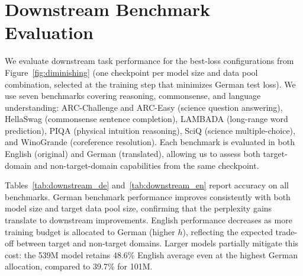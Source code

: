 \section{Downstream Benchmark Evaluation}
\label{app:downstream}

We evaluate downstream task performance for the best-loss configurations from Figure~\ref{fig:diminishing} (one checkpoint per model size and data pool combination, selected at the training step that minimizes German test loss). We use seven benchmarks covering reasoning, commonsense, and language understanding:
ARC-Challenge and ARC-Easy \citep{clark2018think} (science question answering),
HellaSwag \citep{zellers2019hellaswag} (commonsense sentence completion),
LAMBADA \citep{paperno2016lambada} (long-range word prediction),
PIQA \citep{bisk2020piqa} (physical intuition reasoning),
SciQ \citep{welbl2017sciq} (science multiple-choice),
and WinoGrande \citep{sakaguchi2020winogrande} (coreference resolution).
Each benchmark is evaluated in both English (original) and German (translated), allowing us to assess both target-domain and non-target-domain capabilities from the same checkpoint.

Tables~\ref{tab:downstream_de} and~\ref{tab:downstream_en} report accuracy on all benchmarks.
German benchmark performance improves consistently with both model size and target data pool size, confirming that the perplexity gains translate to downstream improvements. English performance decreases as more training budget is allocated to German (higher $h$), reflecting the expected trade-off between target and non-target domains. Larger models partially mitigate this cost: the 539M model retains 48.6\% English average even at the highest German allocation, compared to 39.7\% for 101M.

